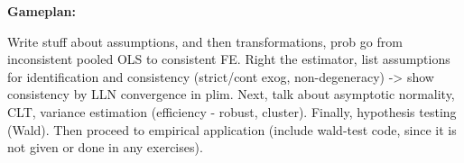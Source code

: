 




\textbf{Gameplan:}

Write stuff about assumptions, and then transformations, prob go from inconsistent pooled OLS to consistent FE. Right the estimator, list assumptions for identification and consistency (strict/cont exog, non-degeneracy) -> show consistency by LLN convergence in plim. Next, talk about asymptotic normality, CLT, variance estimation (efficiency - robust, cluster). Finally, hypothesis testing (Wald). Then proceed to empirical application (include wald-test code, since it is not given or done in any exercises).

